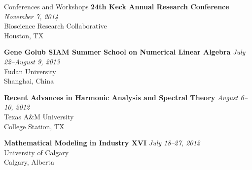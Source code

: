 \documentclass{resume} %
\begin{document}
\begin{rSection}{Conferences and Workshops}
{\bf 24th Keck Annual Research Conference} \hfill {\em November 7, 2014} \\
{\small Bioscience Research Collaborative \\
Houston, TX} 

{\bf Gene Golub SIAM Summer School on Numerical Linear Algebra} \hfill {\em July 22--August 9, 2013} \\
{\small Fudan University\\
Shanghai, China} 

{\bf Recent Advances in Harmonic Analysis and Spectral Theory} \hfill {\em August 6--10, 2012} \\
{\small Texas A\&M University \\
College Station, TX}

{\bf Mathematical Modeling in Industry XVI} \hfill {\em July 18--27, 2012} \\
{\small University of Calgary \\
Calgary, Alberta}
\end{rSection}
\end{document}
